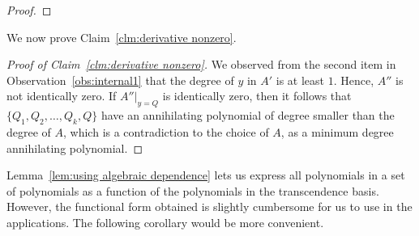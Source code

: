 \begin{proof}
\end{proof}

We now prove Claim~\ref{clm:derivative nonzero}.
\begin{proof}[Proof of Claim~\ref{clm:derivative nonzero}]
We observed from the second item in Observation~\ref{obs:internal1} that the degree of $y$ in $A'$ is at least $1$. Hence, $A''$ is not identically zero.  
If $A''|_{y = Q}$ is identically zero, then it follows that $\{Q_1, Q_2, \ldots, Q_k, Q\}$ have an annihilating polynomial of degree smaller than the degree of $A$, which is a contradiction to the choice of $A$, as a minimum degree annihilating polynomial. 
\end{proof}

Lemma~\ref{lem:using algebraic dependence} lets us express all polynomials in a set of polynomials as a function of the polynomials in the transcendence basis. However, the functional form obtained is slightly cumbersome for us to use in the applications. The following corollary would be more convenient. 

